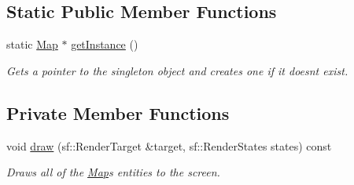\subsection*{Static Public Member Functions}
\begin{DoxyCompactItemize}
\item 
static \hyperlink{class_map}{Map} $\ast$ \hyperlink{class_map_ad82f210fd0c31216ec0dd4ae550b8a05}{get\+Instance} ()
\begin{DoxyCompactList}\small\item\em Gets a pointer to the singleton object and creates one if it doesnt exist. \end{DoxyCompactList}\end{DoxyCompactItemize}
\subsection*{Private Member Functions}
\begin{DoxyCompactItemize}
\item 
void \hyperlink{class_map_ab78fd8c747e184be9b86b993a60ca00b}{draw} (sf\+::\+Render\+Target \&target, sf\+::\+Render\+States states) const
\begin{DoxyCompactList}\small\item\em Draws all of the \hyperlink{class_map}{Map}\textquotesingle{}s entities to the screen. \end{DoxyCompactList}\end{DoxyCompactItemize}
